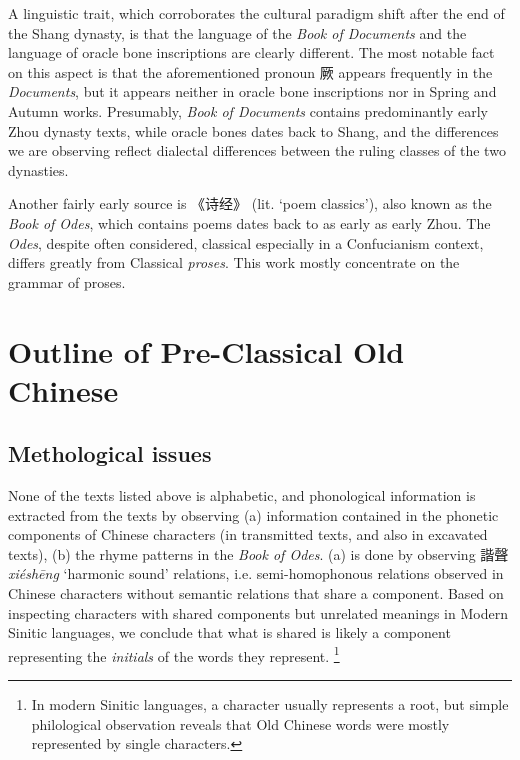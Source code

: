 \documentclass[UTF8, a4paper, oneside, scheme=plain, 12pt]{ctexrep}
\newcommand{\form}[1]{\emph{#1}}
\newcommand{\work}[1]{\textit{#1}}
\newcommand{\translate}[1]{`#1'}
\begin{document}
A linguistic trait, which corroborates the cultural paradigm shift after the end of the Shang dynasty, 
is that the language of the \work{Book of Documents} and the language of oracle bone inscriptions are clearly different.
The most notable fact on this aspect is that
the aforementioned pronoun 厥 appears frequently in the \work{Documents},
but it appears neither in oracle bone inscriptions nor in Spring and Autumn works. 
Presumably, \work{Book of Documents} contains predominantly early Zhou dynasty texts,
while oracle bones dates back to Shang,
and the differences we are observing reflect dialectal differences between the ruling classes of the two dynasties.

Another fairly early source is 《诗经》 (lit. \translate{poem classics}),
also known as the \work{Book of Odes},
which contains poems dates back to as early as early Zhou.
The \work{Odes}, despite often considered, classical especially in a Confucianism context,
differs greatly from Classical \emph{proses}.
This work mostly concentrate on the grammar of proses.


\chapter{Outline of Pre-Classical Old Chinese}

\section{Methological issues}\label{sec:intro.prehistory.reconstruction.problems}

None of the texts listed above is alphabetic,
and phonological information is extracted from the texts by observing
(a) information contained in the phonetic components of Chinese characters
(in transmitted texts, and also in excavated texts),
(b) the rhyme patterns in the \work{Book of Odes}.
(a) is done by observing 諧聲 \form{xiéshēng} \translate{harmonic sound} relations,
i.e. semi-homophonous relations observed in Chinese characters without semantic relations that share a component.
Based on inspecting characters with shared components but unrelated meanings in Modern Sinitic languages,
we conclude that what is shared is likely a component representing the \emph{initials} of the words they represent.%
\footnote{
    In modern Sinitic languages, a character usually represents a root,
    but simple philological observation reveals that Old Chinese words were mostly represented by single characters.
}
\end{document}
